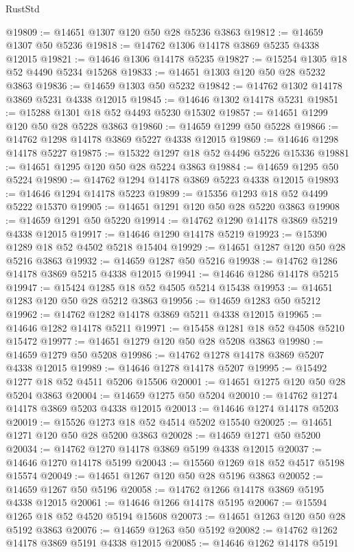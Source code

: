 \begin{lexlean}{RustStd}
\begin{coremodule}
@19809 := @14651 @1307 @120 @50 @28 @5236 @3863
@19812 := @14659 @1307 @50 @5236
@19818 := @14762 @1306 @14178 @3869 @5235 @4338 @12015
@19821 := @14646 @1306 @14178 @5235
@19827 := @15254 @1305 @18 @52 @4490 @5234 @15268
@19833 := @14651 @1303 @120 @50 @28 @5232 @3863
@19836 := @14659 @1303 @50 @5232
@19842 := @14762 @1302 @14178 @3869 @5231 @4338 @12015
@19845 := @14646 @1302 @14178 @5231
@19851 := @15288 @1301 @18 @52 @4493 @5230 @15302
@19857 := @14651 @1299 @120 @50 @28 @5228 @3863
@19860 := @14659 @1299 @50 @5228
@19866 := @14762 @1298 @14178 @3869 @5227 @4338 @12015
@19869 := @14646 @1298 @14178 @5227
@19875 := @15322 @1297 @18 @52 @4496 @5226 @15336
@19881 := @14651 @1295 @120 @50 @28 @5224 @3863
@19884 := @14659 @1295 @50 @5224
@19890 := @14762 @1294 @14178 @3869 @5223 @4338 @12015
@19893 := @14646 @1294 @14178 @5223
@19899 := @15356 @1293 @18 @52 @4499 @5222 @15370
@19905 := @14651 @1291 @120 @50 @28 @5220 @3863
@19908 := @14659 @1291 @50 @5220
@19914 := @14762 @1290 @14178 @3869 @5219 @4338 @12015
@19917 := @14646 @1290 @14178 @5219
@19923 := @15390 @1289 @18 @52 @4502 @5218 @15404
@19929 := @14651 @1287 @120 @50 @28 @5216 @3863
@19932 := @14659 @1287 @50 @5216
@19938 := @14762 @1286 @14178 @3869 @5215 @4338 @12015
@19941 := @14646 @1286 @14178 @5215
@19947 := @15424 @1285 @18 @52 @4505 @5214 @15438
@19953 := @14651 @1283 @120 @50 @28 @5212 @3863
@19956 := @14659 @1283 @50 @5212
@19962 := @14762 @1282 @14178 @3869 @5211 @4338 @12015
@19965 := @14646 @1282 @14178 @5211
@19971 := @15458 @1281 @18 @52 @4508 @5210 @15472
@19977 := @14651 @1279 @120 @50 @28 @5208 @3863
@19980 := @14659 @1279 @50 @5208
@19986 := @14762 @1278 @14178 @3869 @5207 @4338 @12015
@19989 := @14646 @1278 @14178 @5207
@19995 := @15492 @1277 @18 @52 @4511 @5206 @15506
@20001 := @14651 @1275 @120 @50 @28 @5204 @3863
@20004 := @14659 @1275 @50 @5204
@20010 := @14762 @1274 @14178 @3869 @5203 @4338 @12015
@20013 := @14646 @1274 @14178 @5203
@20019 := @15526 @1273 @18 @52 @4514 @5202 @15540
@20025 := @14651 @1271 @120 @50 @28 @5200 @3863
@20028 := @14659 @1271 @50 @5200
@20034 := @14762 @1270 @14178 @3869 @5199 @4338 @12015
@20037 := @14646 @1270 @14178 @5199
@20043 := @15560 @1269 @18 @52 @4517 @5198 @15574
@20049 := @14651 @1267 @120 @50 @28 @5196 @3863
@20052 := @14659 @1267 @50 @5196
@20058 := @14762 @1266 @14178 @3869 @5195 @4338 @12015
@20061 := @14646 @1266 @14178 @5195
@20067 := @15594 @1265 @18 @52 @4520 @5194 @15608
@20073 := @14651 @1263 @120 @50 @28 @5192 @3863
@20076 := @14659 @1263 @50 @5192
@20082 := @14762 @1262 @14178 @3869 @5191 @4338 @12015
@20085 := @14646 @1262 @14178 @5191

\end{coremodule}
\end{lexlean}
